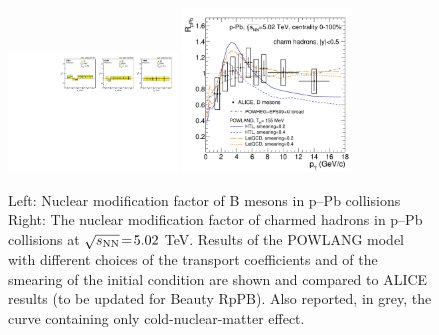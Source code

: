\begin{figure}[ht]
\centering
\includegraphics[trim=0 0 13cm 0,clip,width=0.4\textwidth]{hf/figures/cRpA_lumiTG_2000.pdf}
\includegraphics[width=0.4\textwidth]{hf/figures/RpA-Lang-HTLvsLatQCD-Data-EPS09.pdf}
\caption{
Left: Nuclear modification factor of B mesons in p--Pb collisions
Right: The nuclear modification factor of charmed hadrons in p--Pb collisions at $\sqrt{s_{\rm NN}}\!=\!5.02$ TeV. Results of the POWLANG model with different choices of the transport coefficients and of the smearing of the initial condition are shown and compared to ALICE results (to be updated for Beauty RpPB). Also reported, in grey, the curve containing only cold-nuclear-matter effect.
}
\label{fig:POWLANG-small1}
\end{figure}
